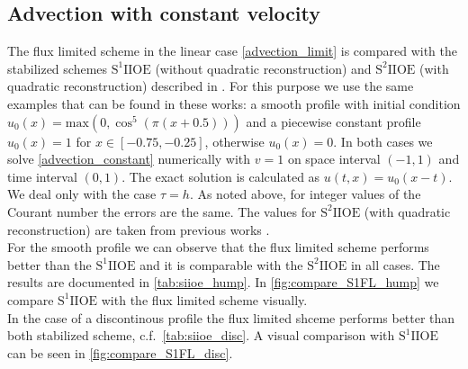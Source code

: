 \documentclass[../include.tex]{subfiles}
\begin{document}
\subsection{Advection with constant velocity}
The flux limited scheme in the linear case \eqref{advection_limit} is compared with the stabilized schemes $ \mathrm{S^1IIOE} $ (without quadratic reconstruction) and $ \mathrm{S^2IIOE} $ (with quadratic reconstruction) described in \cite{iioe1,iioe2}. For this purpose we use the same examples that can be found in these works: a smooth profile with initial condition $ u_0(x) = \mathrm{max}(0, \cos^5(\pi(x+0.5))) $ and a piecewise constant profile $ u_0(x) = 1 $ for $ x\in[-0.75, -0.25] $, otherwise $ u_0(x) = 0 $. In both cases we solve \eqref{advection_constant} numerically with $ v = 1 $ on space interval $ (-1,1) $ and time interval $ (0,1) $. The exact solution is calculated as $ u(t, x) = u_0(x - t) $.\\
We deal only with the case $ \tau = h $. As noted above, for integer values of the Courant number the errors are the same. The values for $ \mathrm{S^2IIOE} $ (with quadratic reconstruction) are taken from previous works \cite{iioe1,iioe2}.\\
For the smooth profile we can observe that the flux limited scheme performs better than the $ \mathrm{S^1IIOE} $ and it is comparable with the $ \mathrm{S^2IIOE} $ in all cases. The results are documented in \ref{tab:siioe_hump}. In \ref{fig:compare_S1FL_hump} we compare $ \mathrm{S^1IIOE} $ with the flux limited scheme visually.\\
In the case of a discontinous profile the flux limited shceme performs better than both stabilized scheme, c.f.\ \ref{tab:siioe_disc}. A visual comparison with $ \mathrm{S^1 IIOE} $ can be seen in \ref{fig:compare_S1FL_disc}.
\end{document}
